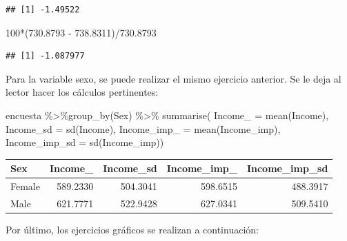 \documentclass[
  12pt,
]{book}
\newenvironment{Shaded}{\begin{snugshade}}{\end{snugshade}}
\newcommand{\AttributeTok}[1]{\textcolor[rgb]{0.77,0.63,0.00}{#1}}
\newcommand{\DecValTok}[1]{\textcolor[rgb]{0.00,0.00,0.81}{#1}}
\newcommand{\FloatTok}[1]{\textcolor[rgb]{0.00,0.00,0.81}{#1}}
\newcommand{\FunctionTok}[1]{\textcolor[rgb]{0.00,0.00,0.00}{#1}}
\newcommand{\NormalTok}[1]{#1}
\newcommand{\SpecialCharTok}[1]{\textcolor[rgb]{0.00,0.00,0.00}{#1}}
\begin{document}
\begin{verbatim}
## [1] -1.49522
\end{verbatim}

\begin{Shaded}
\begin{Highlighting}[]
\DecValTok{100}\SpecialCharTok{*}\NormalTok{(}\FloatTok{730.8793} \SpecialCharTok{{-}} \FloatTok{738.8311}\NormalTok{)}\SpecialCharTok{/}\FloatTok{730.8793}
\end{Highlighting}
\end{Shaded}

\begin{verbatim}
## [1] -1.087977
\end{verbatim}

Para la variable sexo, se puede realizar el mismo ejercicio anterior. Se le deja al lector hacer los cálculos pertinentes:

\begin{Shaded}
\begin{Highlighting}[]
\NormalTok{encuesta }\SpecialCharTok{\%\textgreater{}\%}\FunctionTok{group\_by}\NormalTok{(Sex) }\SpecialCharTok{\%\textgreater{}\%}  \FunctionTok{summarise}\NormalTok{(}
  \AttributeTok{Income\_ =} \FunctionTok{mean}\NormalTok{(Income),}
  \AttributeTok{Income\_sd =} \FunctionTok{sd}\NormalTok{(Income),}
  \AttributeTok{Income\_imp\_ =} \FunctionTok{mean}\NormalTok{(Income\_imp),}
  \AttributeTok{Income\_imp\_sd =} \FunctionTok{sd}\NormalTok{(Income\_imp))}
\end{Highlighting}
\end{Shaded}

\begin{tabular}{l|r|r|r|r}
\hline
Sex & Income\_ & Income\_sd & Income\_imp\_ & Income\_imp\_sd\\
\hline
Female & 589.2330 & 504.3041 & 598.6515 & 488.3917\\
\hline
Male & 621.7771 & 522.9428 & 627.0341 & 509.5410\\
\hline
\end{tabular}

Por último, los ejercicios gráficos se realizan a continuación:
\end{document}

